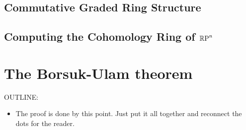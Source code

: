 \documentclass{amsart}
\begin{document}
\subsection{Commutative Graded Ring Structure}

\subsection{Computing the Cohomology Ring of $\mathbb{R}\textrm{P}^n$}




\section{The Borsuk-Ulam theorem}
\label{sec:borsuk-ulam}

OUTLINE:
\begin{itemize}
\item
  The proof is done by this point. Just put it all
  together and reconnect the dots for the reader.
\end{itemize}



\nocite{shul:bfp,brunerie:thesis,br:rp-hott}

\end{document}
